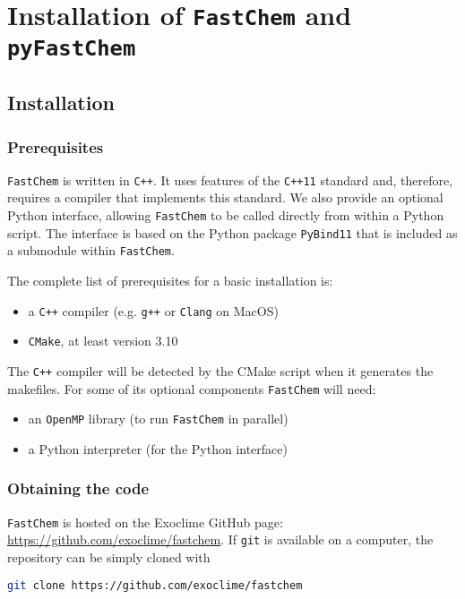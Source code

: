 \documentclass[numbers=noenddot]{aux/fcmanual}
\newcommand{\fc}{\texttt{FastChem}\xspace}
\newcommand{\pfc}{\texttt{pyFastChem}\xspace}
\newcommand{\pb}{\texttt{PyBind11}\xspace}
\newcommand{\ttt}[1]{\texttt {#1}}
\begin{document}
\part{Installation of \fc and \pfc}
\label{part:install}

\chapter{Installation}

\section{Prerequisites}

\fc is written in \ttt{C++}. It uses features of the \ttt{C++11} standard and, therefore, requires a compiler that implements this standard. We also provide an optional Python interface, allowing \fc to be called directly from within a Python script. The interface is based on the Python package \pb that is included as a submodule within \fc.

The complete list of prerequisites for a basic installation is:
\begin{itemize}
	\item a \ttt{C++} compiler (e.g. \ttt{g++} or \ttt{Clang} on MacOS)
	\item \ttt{CMake}, at least version 3.10
\end{itemize}

The \ttt{C++} compiler will be detected by the CMake script when it generates the makefiles. For some of its optional components \fc will need:
\begin{itemize}
	\item an \ttt{OpenMP} library (to run \fc in parallel)
	\item a Python interpreter (for the Python interface)
\end{itemize}


\section{Obtaining the code}

\fc is hosted on the Exoclime GitHub page: \url{https://github.com/exoclime/fastchem}. If \texttt{git} is available on a computer, the repository can be simply cloned with

\begin{lstlisting}[language=bash]
  git clone https://github.com/exoclime/fastchem
\end{lstlisting}
\end{document}
